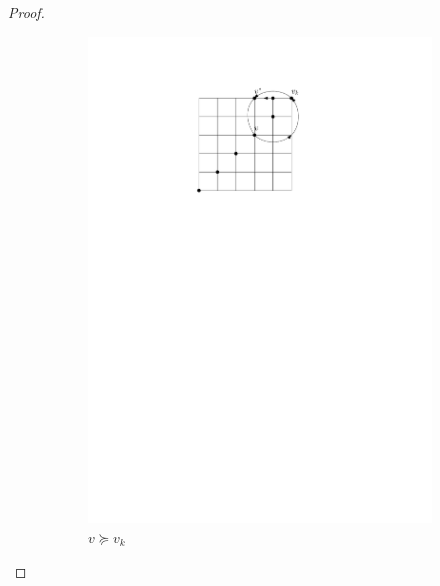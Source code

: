 \documentclass[a4paper,10pt]{article}
\begin{document}
\begin{proof}
   \begin{figure}[htbp] 
       \centering
       \begin{subfigure}[b]{0.4\textwidth}
           \includegraphics[scale = 0.7]{seedlemma_fig2_cas1.pdf}
           \caption{$v \succeq v_k$}
       \end{subfigure}
       \qquad \qquad
       \begin{subfigure}[b]{0.4\textwidth}

\end{subfigure}
\end{figure}
\end{proof}
\end{document}
